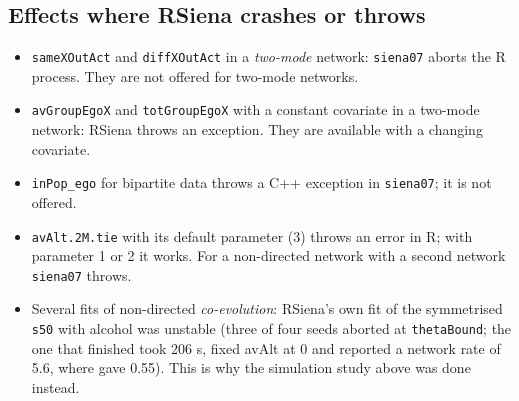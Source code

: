 \subsection{Effects where RSiena crashes or throws}
\begin{itemize}
\item \texttt{sameXOutAct} and \texttt{diffXOutAct} in a \emph{two-mode} network: \texttt{siena07} aborts the R process. They are not offered for two-mode networks.
\item \texttt{avGroupEgoX} and \texttt{totGroupEgoX} with a constant covariate in a two-mode network: RSiena throws an exception. They are available with a changing covariate.
\item \texttt{inPop\_ego} for bipartite data throws a C++ exception in \texttt{siena07}; it is not offered.
\item \texttt{avAlt.2M.tie} with its default parameter (3) throws an error in R; with parameter 1 or 2 it works. For a non-directed network with a second network \texttt{siena07} throws.
\item Several fits of non-directed \emph{co-evolution}: RSiena's own fit of the symmetrised \texttt{s50} with alcohol was unstable (three of four seeds aborted at \texttt{thetaBound}; the one that finished took 206 s, fixed avAlt at 0 and reported a network rate of 5.6, where \nwsaom{} gave 0.55). This is why the simulation study above was done instead.
\end{itemize}

